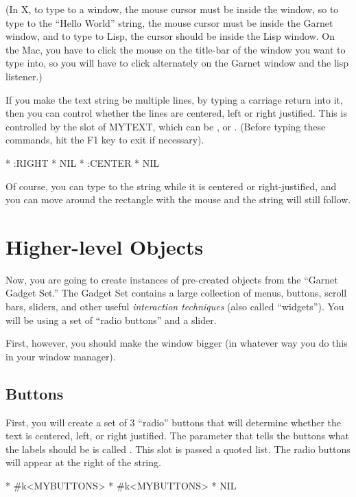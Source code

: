 (In X, to type to a window, the mouse cursor must be inside the window, so to
type to the ``Hello World'' string, the mouse cursor must be inside the Garnet
window, and to type to Lisp, the cursor should be inside the Lisp
window.  On the Mac, you have to click the mouse on the title-bar of
the window you want to type into, so you will have to click
alternately on the Garnet window and the lisp listener.)


If you make the text string be multiple lines, by typing a carriage
return into it,
then you can control whether the lines are centered, left or right
justified.  This is controlled by the  slot of
MYTEXT, which can be , or .
(Before typing these commands, hit the F1 key to exit  
if necessary).
\begin{programexample}
* 
:RIGHT
* 
NIL
* 
:CENTER
* 
NIL
\end{programexample}

Of course, you can type to the string while it is centered or
right-justified, and you can move around the rectangle with the mouse and
the string will still follow.

\section{Higher-level Objects}

Now, you are going to create instances of pre-created objects from the
``Garnet Gadget Set.''  The Gadget Set contains a large collection of menus,
buttons, scroll bars, sliders, and other useful {\it interaction techniques}
(also called ``widgets'').  You will be using a set of ``radio buttons''
and a slider.

First, however, you should make the window bigger (in whatever way you
do this in
your window manager).

\subsection{Buttons}

First, you will create a set of 3 ``radio'' buttons that will determine
whether the text
is centered, left, or right justified.  The parameter that tells the
buttons what the labels should be is called .  This slot is
passed a quoted list.  The radio buttons will appear at the right of
the string.
\begin{programexample}
* 
\#k<MYBUTTONS>
* 
\#k<MYBUTTONS>
* 
NIL
\end{programexample}

